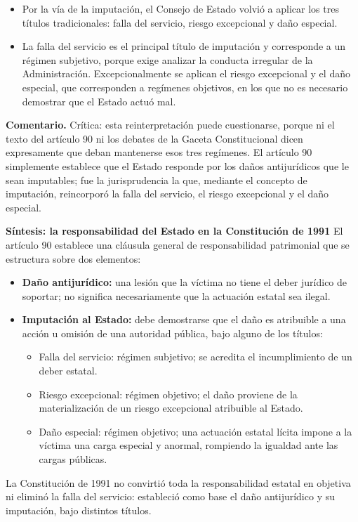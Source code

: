 \begin{itemize}
\item Por la vía de la imputación, el Consejo de Estado volvió a aplicar los tres títulos tradicionales: falla del servicio, riesgo excepcional y daño especial.
\item La falla del servicio es el principal título de imputación y corresponde a un régimen subjetivo, porque exige analizar la conducta irregular de la Administración. Excepcionalmente se aplican el riesgo excepcional y el daño especial, que corresponden a regímenes objetivos, en los que no es necesario demostrar que el Estado actuó mal.
\end{itemize}
\begin{comentario}
\textcolor[HTML]{8A6D3B}{\textbf{Comentario. }}Crítica: esta reinterpretación puede cuestionarse, porque ni el texto del artículo 90 ni los debates de la Gaceta Constitucional dicen expresamente que deban mantenerse esos tres regímenes. El artículo 90 simplemente establece que el Estado responde por los daños antijurídicos que le sean imputables; fue la jurisprudencia la que, mediante el concepto de imputación, reincorporó la falla del servicio, el riesgo excepcional y el daño especial.
\end{comentario}
\textbf{Síntesis: la responsabilidad del Estado en la Constitución de 1991} El artículo 90 establece una cláusula general de responsabilidad patrimonial que se estructura sobre dos elementos:

\begin{itemize}
\item \textbf{Daño antijurídico:} una lesión que la víctima no tiene el deber jurídico de soportar; no significa necesariamente que la actuación estatal sea ilegal.
\item \textbf{Imputación al Estado:} debe demostrarse que el daño es atribuible a una acción u omisión de una autoridad pública, bajo alguno de los títulos:
\begin{itemize}
\item Falla del servicio: régimen subjetivo; se acredita el incumplimiento de un deber estatal.
\item Riesgo excepcional: régimen objetivo; el daño proviene de la materialización de un riesgo excepcional atribuible al Estado.
\item Daño especial: régimen objetivo; una actuación estatal lícita impone a la víctima una carga especial y anormal, rompiendo la igualdad ante las cargas públicas.
\end{itemize}
\end{itemize}
La Constitución de 1991 no convirtió toda la responsabilidad estatal en objetiva ni eliminó la falla del servicio: estableció como base el daño antijurídico y su imputación, bajo distintos títulos.

